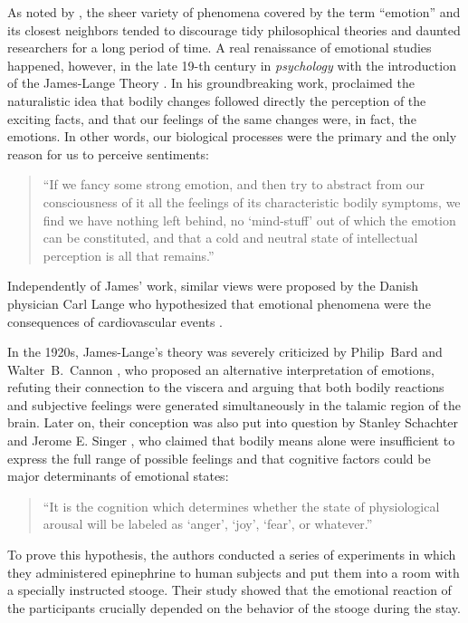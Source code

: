 As noted by \citet{Sousa:14}, the sheer variety of phenomena covered
by the term ``emotion'' and its closest neighbors tended to discourage
tidy philosophical theories and daunted researchers for a long period
of time.  A real renaissance of emotional studies happened, however,
in the late 19-th century in \emph{psychology} with the introduction
of the James-Lange Theory \citep{James:1884}.  In his groundbreaking
work, \citeauthor{James:1884} proclaimed the naturalistic idea that
bodily changes followed directly the perception of the exciting facts,
and that our feelings of the same changes were, in fact, the emotions.
In other words, our biological processes were the primary and the only
reason for us to perceive sentiments:
\begin{quote}
``If we fancy some strong emotion, and then try to abstract from our
  consciousness of it all the feelings of its characteristic bodily
  symptoms, we find we have nothing left behind, no `mind-stuff' out
  of which the emotion can be constituted, and that a cold and neutral
  state of intellectual perception is all that
  remains.''\citep[p. 193]{James:1884}
\end{quote}
Independently of James' work, similar views were proposed by the
Danish physician Carl Lange \citep{Lange:1885} who hypothesized that
emotional phenomena were the consequences of cardiovascular events
\citep[cf.][]{Lang:94}.

In the 1920s, James-Lange's theory was severely criticized by
Philip~Bard and Walter~B.~Cannon \citep{Bard:28,Cannon:31}, who
proposed an alternative interpretation of emotions, refuting their
connection to the viscera and arguing that both bodily reactions and
subjective feelings were generated simultaneously in the talamic
region of the brain.  Later on, their conception was also put into
question by Stanley Schachter and Jerome E. Singer
\citep{Schachter:62}, who claimed that bodily means alone were
insufficient to express the full range of possible feelings and that
cognitive factors could be major determinants of emotional states:
\begin{quote}
  ``It is the cognition which determines whether the state of
  physiological arousal will be labeled as `anger', `joy', `fear', or
  whatever.''\citep[p. 380]{Schachter:62}
\end{quote}
To prove this hypothesis, the authors conducted a series of
experiments in which they administered epinephrine to human subjects
and put them into a room with a specially instructed stooge.  Their
study showed that the emotional reaction of the participants crucially
depended on the behavior of the stooge during the stay.

